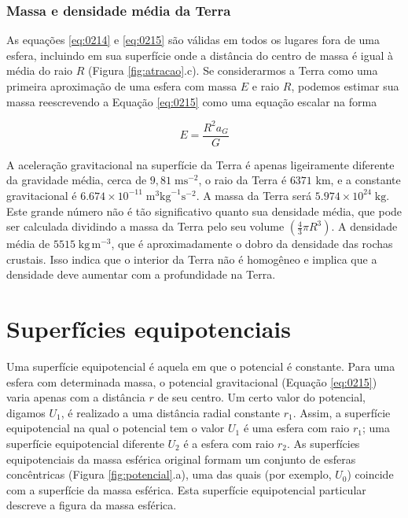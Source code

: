 \documentclass[]{book}
\theoremstyle{definition}
\theoremstyle{definition}
\theoremstyle{definition}
\theoremstyle{remark}
\begin{document}
\hypertarget{massa-e-densidade-media-da-terra}{%
\subsubsection{Massa e densidade média da Terra}\label{massa-e-densidade-media-da-terra}}

As equações \eqref{eq:0214} e \eqref{eq:0215} são válidas em todos os lugares fora de uma esfera, incluindo em sua superfície onde a distância do centro de massa é igual à média do raio \(R\) (Figura \ref{fig:atracao}.c). Se considerarmos a Terra como uma primeira aproximação de uma esfera com massa \(E\) e raio \(R\), podemos estimar sua massa reescrevendo a Equação \eqref{eq:0215} como uma equação escalar na forma

\begin{equation}
E= \frac{R^2a_G}{G} \label{eq:0216}
\end{equation}

A aceleração gravitacional na superfície da Terra é apenas ligeiramente diferente da gravidade média, cerca de \(9,81\; \mathrm{m}\mathrm{s}^{-2}\), o raio da Terra é \(6371\) km, e a constante gravitacional é \(6.674\times 10^{-11}\; \text{m}^3\mathrm{kg}^{-1}\mathrm{s}^{-2}\). A massa da Terra será \(5.974\times 10^{24}\; \mathrm{kg}\). Este grande número não é tão significativo quanto sua densidade média, que pode ser calculada dividindo a massa da Terra pelo seu volume \((\tfrac{4}{3}\pi R^3)\). A densidade média de \(5515\; \mathrm{kg}\,\mathrm{m}^{-3}\), que é aproximadamente o dobro da densidade das rochas crustais. Isso indica que o interior da Terra não é homogêneo e implica que a densidade deve aumentar com a profundidade na Terra.

\hypertarget{superficies-equipotenciais}{%
\section{Superfícies equipotenciais}\label{superficies-equipotenciais}}

Uma superfície equipotencial é aquela em que o potencial é constante. Para uma esfera com determinada massa, o potencial gravitacional (Equação \eqref{eq:0215}) varia apenas com a distância \(r\) de seu centro. Um certo valor do potencial, digamos \(U_1\), é realizado a uma distância radial constante \(r_1\). Assim, a superfície equipotencial na qual o potencial tem o valor \(U_1\) é uma esfera com raio \(r_1\); uma superfície equipotencial diferente \(U_2\) é a esfera com raio \(r_2\). As superfícies equipotenciais da massa esférica original formam um conjunto de esferas concêntricas (Figura \ref{fig:potencial}.a), uma das quais (por exemplo, \(U_0\)) coincide com a superfície da massa esférica. Esta superfície equipotencial particular descreve a figura da massa esférica.
\end{document}
